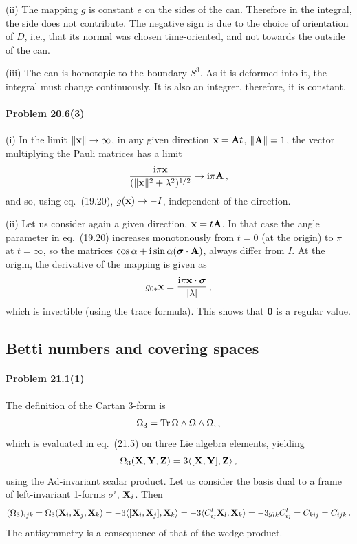 \documentclass[a4paper,12pt]{article}
\def\imagi{\mathrm{i}}
\def\Tr{\ensuremath{\mathop{\rm Tr}}}
\newcommand{\problem}[1]{\paragraph{Problem #1}}
\begin{document}
(ii) The mapping $g$ is constant $e$ on the sides of the can. Therefore in the integral, the side does not contribute. The negative sign is due to the choice of orientation of $D$, i.e., that its normal was chosen time-oriented, and not towards the outside of the can.


(iii) The can is homotopic to the boundary $S^3$. As it is deformed into it, the integral must change continuously. It is also an integrer, therefore, it is constant.


\problem{20.6(3)} (i) In the limit $\|{\bf x}\|\to \infty$, in any given direction ${\bf x}={\bf A} t$, $\|{\bf A}\|=1$, the vector multiplying the Pauli matrices has a limit
\[
 \frac{\imagi \pi {\bf x}}{(\|{\bf x}\|^2+\lambda^2)^{1/2}} \to \imagi \pi{\bf A}\,,
\]
and so, using eq.\ (19.20), $g({\bf x})\to -I$, independent of the direction.

(ii) Let us consider again a given direction, ${\bf x}=t {\bf A}$. In that case the angle parameter in eq.\ (19.20) increases monotonously from $t=0$ (at the origin) to $\pi$ at $t=\infty$, so the matrices $\cos\alpha + \imagi \sin\alpha (\boldsymbol\sigma\cdot {\bf A})$, always differ from $I$. At the origin, the derivative of the mapping is given as
\[
 g_{0*}{\bf x} = \frac{\imagi \pi {\bf x}\cdot\boldsymbol\sigma}{|\lambda|}\,,
\]
which is invertible (using the trace formula). This shows that $\boldsymbol 0$ is a regular value.


\subsection{Betti numbers and covering spaces}


\problem{21.1(1)} The definition of the Cartan 3-form is
\[
 \Omega_3 = \Tr \Omega \wedge \Omega \wedge \Omega,,
\]
which is evaluated in eq.\ (21.5) on three Lie algebra elements, yielding
\[
 \Omega_3({\bf X}, {\bf Y}, {\bf Z}) = 3\langle [{\bf X}, {\bf Y}], {\bf Z}\rangle\,,
\]
using the Ad-invariant scalar product. Let us consider the basis dual to a frame of left-invariant 1-forms $\sigma^i$, ${\bf X}_i$. Then
\[
 (\Omega_3)_{ijk} = \Omega_3({\bf X}_i, {\bf X}_j, {\bf X}_k) = -3\langle [{\bf X}_i, {\bf X}_j], {\bf X}_k\rangle = -3\langle C_{ij}^l {\bf X}_l, {\bf X}_k\rangle = -3g_{lk}C^l_{ij} = C_{kij} = C_{ijk}\,.
\]
The antisymmetry is a consequence of that of the wedge product.
\end{document}
